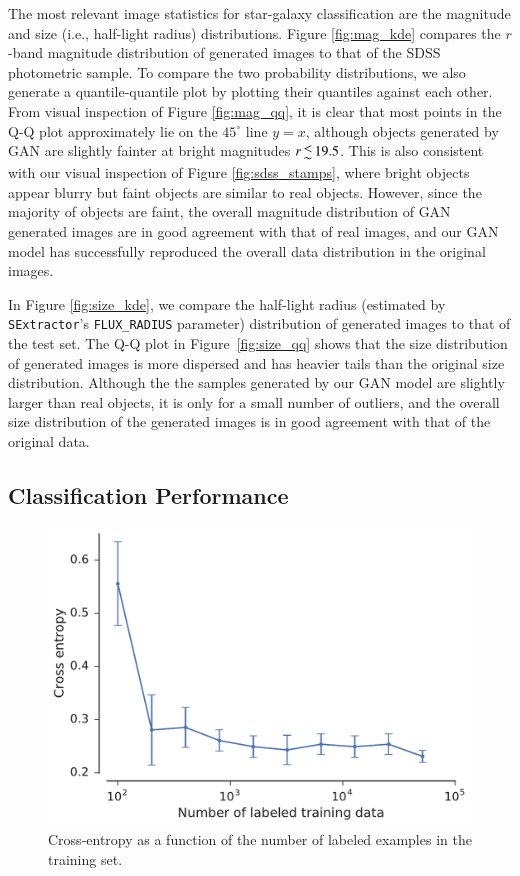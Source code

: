 \documentclass[fleqn,usenatbib]{mnras}
\newcommand{\ie}{{i.e., }}
\begin{document}
The most relevant image statistics for star-galaxy classification are the magnitude and size (\ie half-light radius) distributions.
Figure \ref{fig:mag_kde} compares the $r$-band magnitude distribution of generated images to that of the SDSS photometric sample.
To compare the two probability distributions, we also generate a quantile-quantile plot
\citep[Q-Q plot;][]{wilk1968probability} by plotting their quantiles against each other.
From visual inspection of Figure \ref{fig:mag_qq},
it is clear that most points in the Q-Q plot approximately lie on the $45^{\circ}$ line $y = x$,
although objects generated by GAN are slightly fainter at bright magnitudes $r \la 19.5$.
This is also consistent with our visual inspection of Figure \ref{fig:sdss_stamps}, where bright objects appear blurry
but faint objects are similar to real objects.
However, since the majority of objects are faint, the overall magnitude distribution of GAN generated images are in good agreement with
that of real images,
and our GAN model has successfully reproduced the overall data distribution in the original images.

In Figure \ref{fig:size_kde}, we compare the half-light radius
(estimated by \texttt{SExtractor}'s \texttt{FLUX\_RADIUS} parameter) distribution of generated images to that of the test set.
The Q-Q plot in Figure~\ref{fig:size_qq} shows that the size distribution of generated images is more dispersed
and has heavier tails than the original size distribution.
Although the the samples generated by our GAN model are slightly larger than real objects,
it is only for a small number of outliers, and
the overall size distribution of the generated images is in good agreement with that of the original data.

\subsection{Classification Performance}
  \label{sec:classification}
  
\begin{figure}
  \centering
  \includegraphics[width=\columnwidth]{figures/loss_vs_n.pdf}
  \caption{Cross-entropy as a function of the number of labeled examples in the training set.}
  \label{fig:loss_vs_n}
\end{figure}
\end{document}
